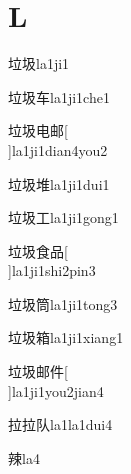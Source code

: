 \section*{L}

\begin{verbete}[8;6]{垃圾}{la1ji1}
\end{verbete}

\begin{verbete}[8;6;4]{垃圾车}{la1ji1che1}
\end{verbete}

\begin{verbete}[8;6;5;7]{垃圾电邮}[\\]{la1ji1dian4you2}
\end{verbete}

\begin{verbete}[8;6;11]{垃圾堆}{la1ji1dui1}
\end{verbete}

\begin{verbete}[8;6;3]{垃圾工}{la1ji1gong1}
\end{verbete}

\begin{verbete}[8;6;9;9]{垃圾食品}[\\]{la1ji1shi2pin3}
\end{verbete}

\begin{verbete}[8;6;12]{垃圾筒}{la1ji1tong3}
\end{verbete}

\begin{verbete}[8;6;15]{垃圾箱}{la1ji1xiang1}
\end{verbete}

\begin{verbete}[8;6;7;6]{垃圾邮件}[\\]{la1ji1you2jian4}
\end{verbete}

\begin{verbete}[8;8;4]{拉拉队}{la1la1dui4}
\end{verbete}

\begin{verbete}[14]{辣}{la4}
\end{verbete}

